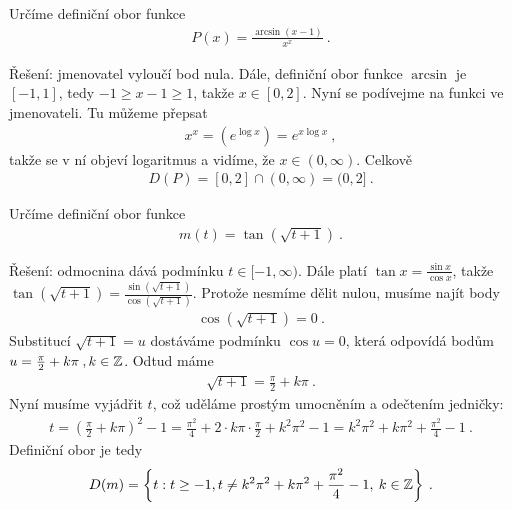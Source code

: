 \begin{example}
    Určíme definiční obor funkce \begin{align*}
        P(x) = \frac{\arcsin (x-1)}{x^x} \:.
    \end{align*}

    Řešení: jmenovatel vyloučí bod nula. Dále, definiční obor funkce $\arcsin$ je $[-1,1]$, tedy $ -1 \geq x-1 \geq 1$, takže $x \in [0,2]$. 
    Nyní se podívejme na funkci ve jmenovateli. Tu můžeme přepsat \begin{align*}
        x^x = \left( e^{\log x} \right) = e^{x \log x} \:,
    \end{align*}
    takže se v ní objeví logaritmus a vidíme, že $x \in (0, \infty)$.
    Celkově \begin{align*}
        \boxed{ D(P) = [0,2] \cap (0, \infty) = (0,2] } \:.
    \end{align*}

\end{example}

\begin{example}
    Určíme definiční obor funkce 
    \begin{align*}
        m(t) = \tan (\sqrt{t+1}) \:.
    \end{align*}

    Řešení: odmocnina dává podmínku $t \in [-1,\infty)$. Dále platí $\tan x = \frac{\sin x}{\cos x} $, takže $\tan (\sqrt {t+1}) = \frac{\sin (\sqrt {t+1})}{\cos (\sqrt {t+1})}$. Protože nesmíme dělit nulou, musíme najít body \begin{align*}
        \cos (\sqrt{t+1}) = 0 \:.
    \end{align*}
    Substitucí $\sqrt{t+1} = u$ dostáváme podmínku $\cos u =0$, která odpovídá bodům $u = \frac{\pi}{2} + k \pi \:, k \in \mathbb{Z}$. Odtud máme \begin{align*}
        \sqrt{t+1} = \frac{\pi}{2} + k \pi \:.
    \end{align*}
    Nyní musíme vyjádřit $t$, což uděláme prostým umocněním a odečtením jedničky:
    \begin{align*}
        t =  \left( \frac{\pi}{2} + k \pi \right)^2 - 1 = \frac{\pi^2}{4} + 2 \cdot k \pi \cdot \frac{\pi}{2} + k^2 \pi^2 - 1 = k^2 \pi^2 + k \pi^2 + \frac{\pi^2}{4} - 1 \:.
    \end{align*}
    Definiční obor je tedy \begin{align*}
        D(m) = \left \lbrace t : t \geq -1, t \neq k^2 \pi^2 + k \pi^2 + \frac{\pi^2}{4} - 1, \: k \in \mathbb{Z} \right \rbrace \:.
    \end{align*}
\end{example}

